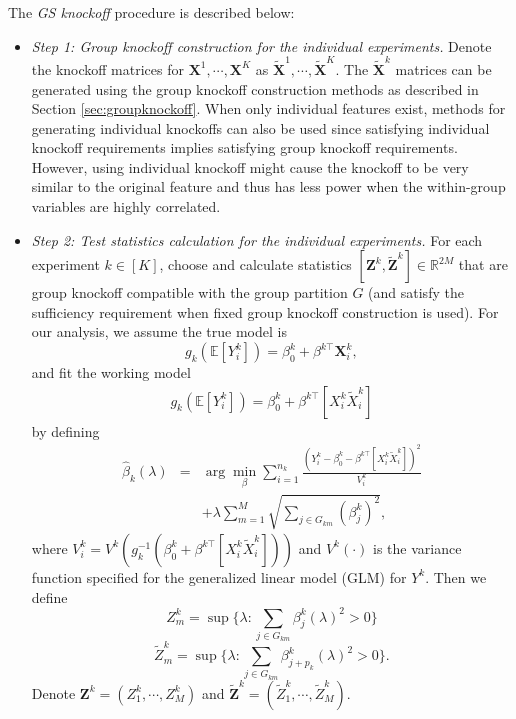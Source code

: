 \documentclass[11pt]{article}
\theoremstyle{plain}
\theoremstyle{definition}
\theoremstyle{remark}
\def\R{\mathbb{R}}
\newcommand{\EE}[1]{\mathbb{E}\left[{#1}\right]} %
\def\R{\mathbb{R}}
\def\Z{\mathbf{Z}}
\newcommand{\X}{\mathbf{X}}
\newcommand{\0}{\mathbf{0}}
\begin{document}
The \textit{GS knockoff} procedure is described below:
\begin{itemize}
    
    \item \textit{Step 1: Group knockoff construction for the individual experiments.} Denote the knockoff matrices for $\X^1,\cdots,\X^K$ as $\widetilde{\X}^1, \cdots,\widetilde{\X}^K$. The $\widetilde{\X}^k$ matrices can be generated using the group knockoff construction methods as described in Section \ref{sec:groupknockoff}. When only individual features exist, methods for generating individual knockoffs \citep{barber2015, candes2018, romano2019, bates2020, spector2020} can also be used since satisfying individual knockoff requirements implies satisfying group knockoff requirements. However, using individual knockoff might cause the knockoff to be very similar to the original feature and thus has less power when the within-group variables are highly correlated. 
    
    \item \textit{Step 2: Test statistics calculation for the individual experiments.} For each experiment $k \in [K]$, choose and calculate statistics $[\Z^k, \widetilde{\Z}^k] \in \R^{2M}$ that are group knockoff compatible with the group partition $G$ (and satisfy the sufficiency requirement when fixed group knockoff construction is used). 
    For our analysis, we assume the true model is
    \begin{equation}
    g_k(\EE{Y_{i}^k})=\beta_0^k+\beta^{k\top}\X^k_{i},
    \end{equation}
    and fit the working model
    \begin{multline} g_k(\EE{Y_{i}^k})=\beta_0^k+\beta^{k\top}[X_i^k \widetilde{X}_i^k]
    \end{multline}    
    by defining 
    \begin{eqnarray*}
    \widehat{\beta}_k(\lambda)&=&\arg\min_{\beta} \sum_{i=1}^{n_k}\frac{(Y_i^k-\beta_0^k-\beta^{k\top}[X_i^k \widetilde{X}_i^k])^2}{V^k_i}\\&&+\lambda \sum_{m=1}^M \sqrt{\sum_{j\in G_{km}}(\beta_{j}^k)^2},
    \end{eqnarray*}
    where $V^k_i=V^k(g_k^{-1}(\beta_0^k+\beta^{k\top}[X_i^k \widetilde{X}_i^k]))$ and $V^k(\cdot)$ is the variance function specified for the generalized linear model (GLM) for $Y^k$. Then we define 
    \begin{equation}
    Z^k_m=\sup\{\lambda: \sum_{j\in G_{km}}\beta^k_j(\lambda)^2>0\}
    \end{equation}
   \begin{equation}
   \widetilde{Z}^k_m=\sup\{\lambda: \sum_{j\in G_{km}}\beta^k_{j+p_k}(\lambda)^2>0\}.
   \end{equation}
Denote $\Z^k = (Z_1^k,\cdots,Z_M^k)$ and $\widetilde{\Z}^k = (\widetilde{Z}_1^k,\cdots,\widetilde{Z}_M^k)$.
    

\end{itemize}
\end{document}
